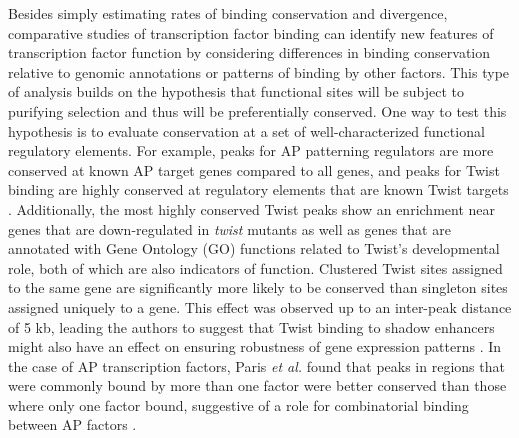 Besides simply estimating rates of binding conservation and divergence, comparative studies of transcription factor binding can identify new features of transcription factor function by considering differences in binding conservation relative to genomic annotations or patterns of binding by other factors. This type of analysis builds on the hypothesis that functional sites will be subject to purifying selection and thus will be preferentially conserved. One way to test this hypothesis is to evaluate conservation at a set of well-characterized functional regulatory elements. For example, peaks for AP patterning regulators are more conserved at known AP target genes compared to all genes, and peaks for Twist binding are highly conserved at regulatory elements that are known Twist targets \citep{bradley_binding_2010,he_high_2011,paris_extensive_2013}. Additionally, the most highly conserved Twist peaks show an enrichment near genes that are down-regulated in \emph{twist} mutants as well as genes that are annotated with Gene Ontology (GO) functions related to Twist's developmental role, both of which are also indicators of function. Clustered Twist sites assigned to the same gene are significantly more likely to be conserved than singleton sites assigned uniquely to a gene. This effect was observed up to an inter-peak distance of 5 kb, leading the authors to suggest that Twist binding to shadow enhancers might also have an effect on ensuring robustness of gene expression patterns \citep{he_high_2011}. In the case of AP transcription factors, Paris \emph{et al.} found that peaks in regions that were commonly bound by more than one factor were better conserved than those where only one factor bound, suggestive of a role for combinatorial binding between AP factors \citep{paris_extensive_2013}.\\

